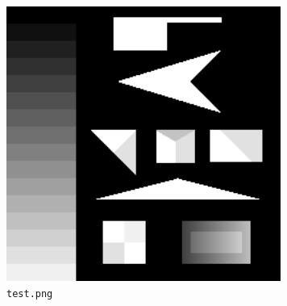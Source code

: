 \documentclass[11pt, spanish]{article}
\begin{document}
\begin{figure}[H]
\centering
  \includegraphics[height=9cm]{ej1-imgs/test-original.png}
  \caption{\texttt{test.png}}
\end{figure}
\end{document}
